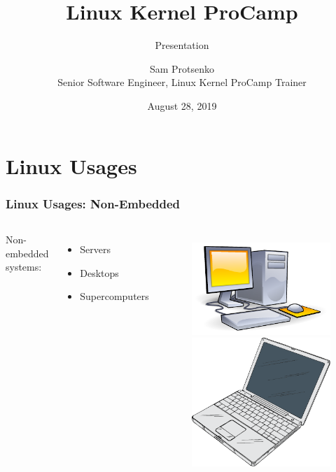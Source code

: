 \documentclass[aspectratio=169]{beamer}
\title{Linux Kernel ProCamp}
\subtitle{Presentation}
\author{Sam Protsenko \\ Senior Software Engineer, Linux Kernel ProCamp Trainer}
\date{\vspace*{5mm}August 28, 2019}
\institute{GlobalLogic}
\begin{document}
\maketitle


\section{Linux Usages}

\begin{frame}
  \frametitle{Linux Usages: Non-Embedded}
  \begin{columns}
    Non-embedded systems:
      \begin{itemize}
        \item Servers
        \item Desktops
        \item Supercomputers
      \end{itemize}
    \begin{figure}
      \centering
      \includegraphics[scale=0.7]{images/pc.pdf}
      \includegraphics[scale=0.25]{images/laptop.pdf}

\end{figure}
\end{columns}
\end{frame}
\end{document}
